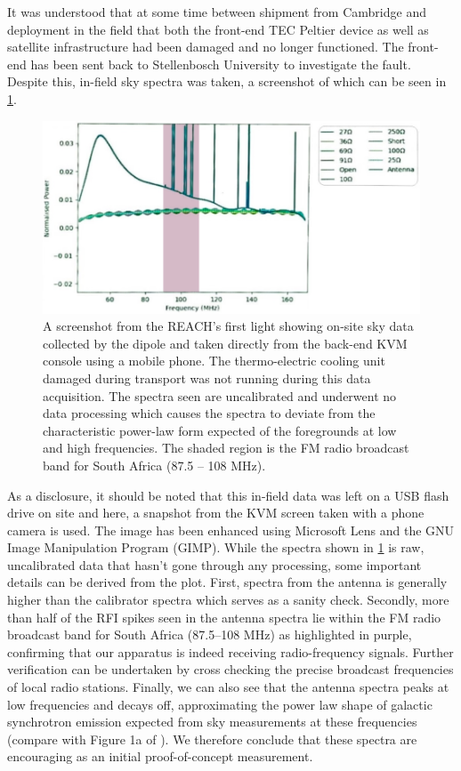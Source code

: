 It was understood that at some time between shipment from Cambridge and deployment in the field that both the front-end TEC Peltier device as well as satellite infrastructure had been damaged and no longer functioned. The front-end has been sent back to Stellenbosch University to investigate the fault. Despite this, in-field sky spectra was taken, a screenshot of which can be seen in \cref{fig:onsite_data}.
\begin{figure}
    \centering
    \includegraphics[scale=0.4]{onsite_data}
    \caption{A screenshot from the REACH's first light showing on-site sky data collected by the dipole and taken directly from the back-end KVM console using a mobile phone. The thermo-electric cooling unit damaged during transport was not running during this data acquisition. The spectra seen are uncalibrated and underwent no data processing which causes the spectra to deviate from the characteristic power-law form expected of the foregrounds at low and high frequencies. The shaded region is the FM radio broadcast band for South Africa (87.5 -- 108 MHz).}
    \label{fig:onsite_data}
\end{figure}
As a disclosure, it should be noted that this in-field data was left on a USB flash drive on site and here, a snapshot from the KVM screen taken with a phone camera is used. The image has been enhanced using Microsoft Lens and the GNU Image Manipulation Program (GIMP). While the spectra shown in \cref{fig:onsite_data} is raw, uncalibrated data that hasn't gone through any processing, some important details can be derived from the plot. First, spectra from the antenna is generally higher than the calibrator spectra which serves as a sanity check. Secondly, more than half of the RFI spikes seen in the antenna spectra lie within the FM radio broadcast band for South Africa (87.5--108 MHz) as highlighted in purple, confirming that our apparatus is indeed receiving radio-frequency signals. Further verification can be undertaken by cross checking the precise broadcast frequencies of local radio stations. Finally, we can also see that the antenna spectra peaks at low frequencies and decays off, approximating the power law shape of galactic synchrotron emission expected from sky measurements at these frequencies (compare with Figure 1a of \citet{edgesNature}). We therefore conclude that these spectra are encouraging as an initial proof-of-concept measurement.

